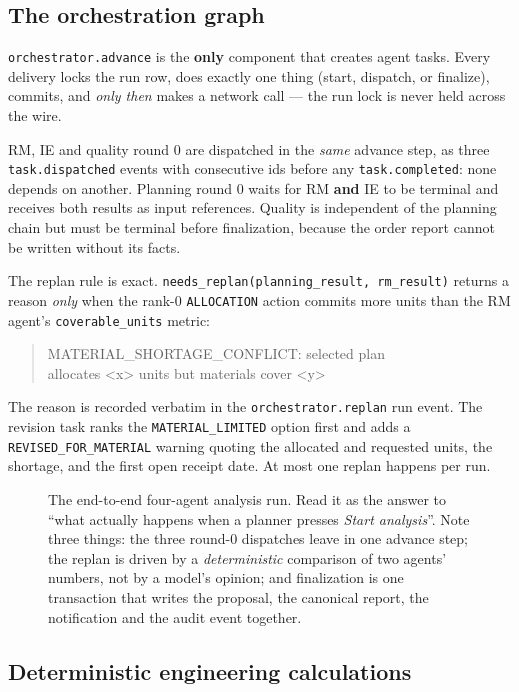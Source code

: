 \documentclass[11pt,a4paper]{article}
\newcommand{\widefig}[3]{%
  \begin{landscape}
  \begin{figure}[p]
  \centering
  \resizebox{!}{#3\textheight}{}
  \caption{#2}
  \end{figure}
  \end{landscape}}
\begin{document}
\subsection{The orchestration graph}

\texttt{orchestrator.advance} is the \textbf{only} component that creates agent
tasks. Every delivery locks the run row, does exactly one thing (start,
dispatch, or finalize), commits, and \emph{only then} makes a network call ---
the run lock is never held across the wire.

RM, IE and quality round 0 are dispatched in the \emph{same} advance step, as
three \texttt{task.dispatched} events with consecutive ids before any
\texttt{task.completed}: none depends on another. Planning round 0 waits for RM
\textbf{and} IE to be terminal and receives both results as input references.
Quality is independent of the planning chain but must be terminal before
finalization, because the order report cannot be written without its facts.

The replan rule is exact. \texttt{needs\_replan(planning\_result, rm\_result)}
returns a reason \emph{only} when the rank-0 \texttt{ALLOCATION} action commits
more units than the RM agent's \texttt{coverable\_units} metric:

\begin{quote}\footnotesize\ttfamily
MATERIAL\_SHORTAGE\_CONFLICT: selected plan\\ allocates <x> units but materials cover <y>
\end{quote}

\noindent The reason is recorded verbatim in the \texttt{orchestrator.replan}
run event. The revision task ranks the \texttt{MATERIAL\_LIMITED} option first
and adds a \texttt{REVISED\_FOR\_MATERIAL} warning quoting the allocated and
requested units, the shortage, and the first open receipt date. At most one
replan happens per run.

\widefig{d4-agent-sequence}{The end-to-end four-agent analysis run. Read it as
the answer to ``what actually happens when a planner presses \emph{Start
analysis}''. Note three things: the three round-0 dispatches leave in one advance
step; the replan is driven by a \emph{deterministic} comparison of two agents'
numbers, not by a model's opinion; and finalization is one transaction that
writes the proposal, the canonical report, the notification and the audit event
together.}{0.93}
\label{fig:seq}

\subsection{Deterministic engineering calculations}
\end{document}

